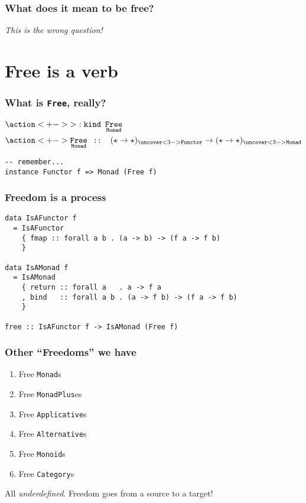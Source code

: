 \documentclass[pdf]{beamer}
\renewcommand{\to}{\ensuremath{\rightarrow}}
\DeclareMathOperator{\Free}{\texttt{Free}}
\DeclareMathOperator{\Monad}{\texttt{Monad}}
\DeclareMathOperator{\Functor}{\texttt{Functor}}
\DeclareMathOperator{\ty}{\texttt{ :: }}
\begin{document}
\begin{frame}
  \frametitle{What does it mean to be free?}
  \pause

  \textit{This is the wrong question!}
\end{frame}

\section{Free is a verb}

\begin{frame}[fragile]
  \frametitle{What is \texttt{Free}, really?}
  

  \begin{align*}
    & \action<+->{\mathtt{>}\ \mathtt{:kind}\ \Free_{\Monad}} \\
    & \action<+->{
        \Free_{\Monad} \ty 
          (\star \to \star)_{\uncover<3->{\Functor}} \to
          (\star \to \star)_{\uncover<3->{\Monad}}
      }
  \end{align*}
  
\pause

\begin{tcolorbox}[boxrule=0pt, arc=0pt, outer arc=0pt]
\begin{lstlisting}
-- remember...
instance Functor f => Monad (Free f)
\end{lstlisting}
\end{tcolorbox}
\end{frame}

\begin{frame}[fragile]
  \frametitle{Freedom is a process}

\begin{lstlisting}
data IsAFunctor f
  = IsAFunctor 
    { fmap :: forall a b . (a -> b) -> (f a -> f b) 
    }

data IsAMonad f
  = IsAMonad
    { return :: forall a   . a -> f a
    , bind   :: forall a b . (a -> f b) -> (f a -> f b)
    }

free :: IsAFunctor f -> IsAMonad (Free f)
\end{lstlisting}
\end{frame}

\begin{frame}
  \frametitle{Other ``Freedoms'' we have}
  \begin{enumerate}
  \item Free \texttt{Monad}s
  \item Free \texttt{MonadPlus}es
  \item Free \texttt{Applicative}s
  \item Free \texttt{Alternative}s
  \item Free \texttt{Monoid}s
  \item Free \texttt{Category}s
  \end{enumerate}
  
  \pause

  All \textit{underdefined}. Freedom goes from a source to a target!
\end{frame}
\end{document}
